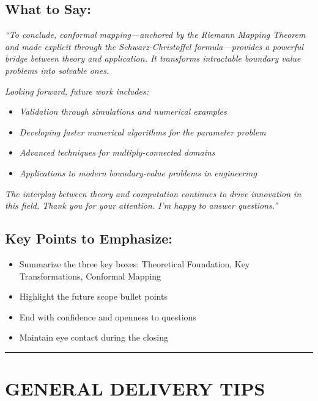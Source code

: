 \documentclass[12pt,a4paper]{article}
\begin{document}
\subsection*{What to Say:}
\begin{quotebox}
\textit{``To conclude, conformal mapping---anchored by the Riemann Mapping Theorem and made explicit through the Schwarz-Christoffel formula---provides a powerful bridge between theory and application. It transforms intractable boundary value problems into solvable ones.}

\textit{Looking forward, future work includes:}
\begin{itemize}
    \item \textit{Validation through simulations and numerical examples}
    \item \textit{Developing faster numerical algorithms for the parameter problem}
    \item \textit{Advanced techniques for multiply-connected domains}
    \item \textit{Applications to modern boundary-value problems in engineering}
\end{itemize}

\textit{The interplay between theory and computation continues to drive innovation in this field. Thank you for your attention. I'm happy to answer questions.''}
\end{quotebox}

\subsection*{Key Points to Emphasize:}
\begin{itemize}[leftmargin=*]
    \item Summarize the three key boxes: Theoretical Foundation, Key Transformations, Conformal Mapping
    \item Highlight the future scope bullet points
    \item End with confidence and openness to questions
    \item Maintain eye contact during the closing
\end{itemize}

\vspace{10pt}
\hrule
\vspace{10pt}

\section*{GENERAL DELIVERY TIPS}
\end{document}
